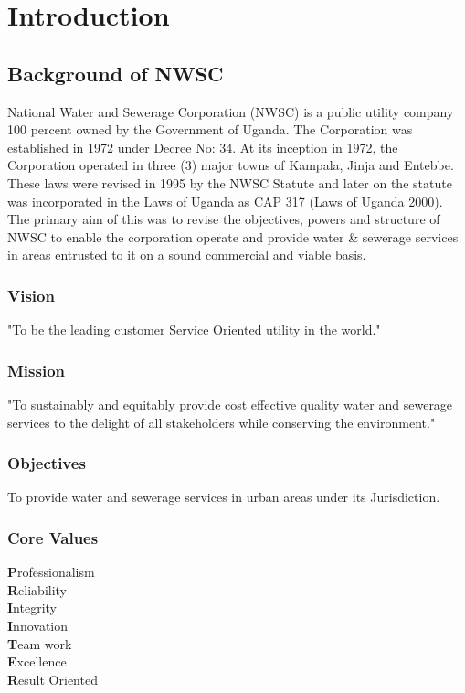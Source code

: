 \documentclass{article}
\begin{document}
\section{Introduction}


\subsection{Background of NWSC}\cite{nwscwebsite}
National Water and Sewerage Corporation (NWSC) is a public utility company 100 percent owned by the Government of Uganda. The Corporation was established in 1972 under Decree No: 34. At its inception in 1972, the Corporation operated in three (3) major towns of Kampala, Jinja and Entebbe. These laws were revised in 1995 by the NWSC Statute and later on the statute was incorporated in the Laws of Uganda as CAP 317 (Laws of Uganda 2000). The primary aim of this was to revise the objectives, powers and structure of NWSC to enable the corporation operate and provide water \& sewerage services in areas entrusted to it on a sound commercial and viable basis.
\subsubsection{Vision}
"To be the leading customer Service Oriented utility in the world." 
\subsubsection{Mission}
"To sustainably and equitably provide cost effective quality water and sewerage services to the delight of all stakeholders while conserving the environment."
\subsubsection{Objectives}
To provide water and sewerage services in urban areas under its Jurisdiction.
\subsubsection{Core Values}
\textbf{P}rofessionalism\\ 
\textbf{R}eliability\\
\textbf{I}ntegrity\\
\textbf{I}nnovation\\
\textbf{T}eam work\\
\textbf{E}xcellence\\
\textbf{R}esult Oriented\\
\end{document}
